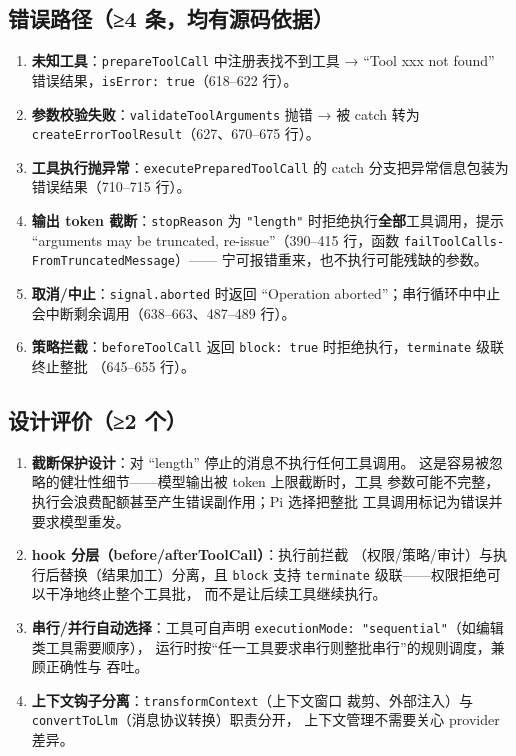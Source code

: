 \subsection{错误路径（≥4 条，均有源码依据）}

\begin{enumerate}[leftmargin=4em,itemsep=0pt,topsep=2pt]
    \item \textbf{未知工具}：\texttt{prepareToolCall} 中注册表找不到工具 →
          ``Tool xxx not found'' 错误结果，\texttt{isError: true}（618--622 行）。
    \item \textbf{参数校验失败}：\texttt{validateToolArguments} 抛错 → 被
          catch 转为 \texttt{createErrorToolResult}（627、670--675 行）。
    \item \textbf{工具执行抛异常}：\texttt{executePreparedToolCall} 的 catch
          分支把异常信息包装为错误结果（710--715 行）。
    \item \textbf{输出 token 截断}：\texttt{stopReason} 为 \texttt{"length"}
          时拒绝执行\textbf{全部}工具调用，提示 ``arguments may be
          truncated, re-issue''（390--415 行，函数
          \texttt{failToolCalls-}\allowbreak\texttt{FromTruncatedMessage}）——
          宁可报错重来，也不执行可能残缺的参数。
    \item \textbf{取消/中止}：\texttt{signal.aborted} 时返回
          ``Operation aborted''；串行循环中中止会中断剩余调用（638--663、487--489 行）。
    \item \textbf{策略拦截}：\texttt{beforeToolCall} 返回
          \texttt{block: true} 时拒绝执行，\texttt{terminate} 级联终止整批
          （645--655 行）。
\end{enumerate}

\subsection{设计评价（≥2 个）}

\begin{enumerate}[leftmargin=4em,itemsep=0pt,topsep=2pt]
    \item \textbf{截断保护设计}：对 ``length'' 停止的消息不执行任何工具调用。
          这是容易被忽略的健壮性细节——模型输出被 token 上限截断时，工具
          参数可能不完整，执行会浪费配额甚至产生错误副作用；Pi 选择把整批
          工具调用标记为错误并要求模型重发。
    \item \textbf{hook 分层（before/afterToolCall）}：执行前拦截
          （权限/策略/审计）与执行后替换（结果加工）分离，且 \texttt{block}
          支持 \texttt{terminate} 级联——权限拒绝可以干净地终止整个工具批，
          而不是让后续工具继续执行。
    \item \textbf{串行/并行自动选择}：工具可自声明
          \texttt{executionMode: "sequential"}（如编辑类工具需要顺序），
          运行时按``任一工具要求串行则整批串行''的规则调度，兼顾正确性与
          吞吐。
    \item \textbf{上下文钩子分离}：\texttt{transformContext}（上下文窗口
          裁剪、外部注入）与 \texttt{convertToLlm}（消息协议转换）职责分开，
          上下文管理不需要关心 provider 差异。
\end{enumerate}

